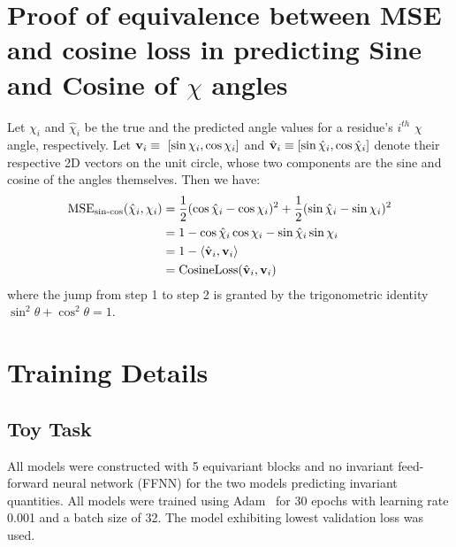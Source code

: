 
\section{Proof of equivalence between MSE and cosine loss in predicting Sine and Cosine of $\chi$
angles}
Let ${\chi_i}$ and $\hat\chi_i$ be the true and the predicted angle values for a residue's $i^{th}$
$\chi$ angle, respectively. Let ${{\bf v}_i\equiv~[\sin {\chi_i},\cos {\chi_i}]}$ and ${\hat{\bf
v}_i\equiv[\sin { \hat \chi_i},\cos  {\hat \chi_i}]}$ denote their respective 2D vectors on the
unit circle, whose two components are the sine and cosine of the angles themselves. Then we have:
\begin{align}
 \nonumber    \text{MSE}_{\text{sin-cos}}(\hat\chi_i, \chi_i)
    \nonumber                                &= \frac{1}{2}(\cos \hat \chi_i - \cos \chi_i)^2 + \frac{1}{2}(\sin\hat \chi_i - \sin \chi_i)^2 \\
             \nonumber                       &= 1 - \cos \hat \chi_i  \cos {\chi_i} - \sin \hat \chi_i  \sin {\chi_i} \\
               \nonumber                     &= 1 - \langle \hat{\bf v}_{i},{\bf v}_i \rangle \\
                                    &= \text{CosineLoss}(\hat{\bf v}_{i}, {\bf v}_i)
    \label{eqn:proof_of_equivalence_sin_cos}
\end{align}
where the jump from step 1 to step 2 is granted by the trigonometric identity $\sin^2 \theta +
\cos^2 \theta = 1$.


\section{Training Details}
\label{sec:training_details}

\subsection{Toy Task}
All models were constructed with 5 equivariant blocks and no invariant feed-forward neural network
(FFNN) for the two models predicting invariant quantities. All models were trained using
Adam~\citep{kingma_adam_2017} for 30 epochs with learning rate 0.001 and a batch size of 32. The
model exhibiting lowest validation loss was used.

